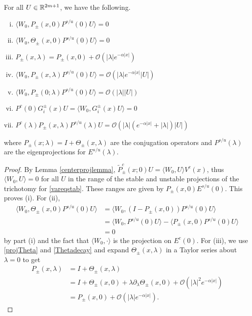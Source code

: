 \documentclass[thesis.tex]{subfiles}
\begin{document}
\begin{lemma}\label{W0projlemma}
For all $U \in \mathbb{R}^{2m+1}$, we have the following.
\begin{enumerate}[(i)]
	\item $\langle W_0, P_\pm(x, 0) P^{s/u}(0) U \rangle = 0$
	\item $\langle W_0, \Theta_\pm(x, 0) P^{s/u}(0) U \rangle = 0$
	\item $P_\pm(x, \lambda) = P_\pm(x, 0) + \mathcal{O}(|\lambda|e^{-\alpha|x|})$
	\item $\langle W_0, P_\pm(x, \lambda) P^{s/u}(0) U \rangle = \mathcal{O}(|\lambda|e^{-\alpha|x|}|U|)$
	\item $\langle W_0, P_\pm(0; \lambda) P^{s/u}(0) U \rangle = \mathcal{O}(|\lambda||U|)$
	\item $P^c(0) G_i^\pm(x) U = \langle W_0, G_i^\pm(x) U\rangle = 0$
	\item $P^c(\lambda) P_\pm(x, \lambda) P^{s/u}(\lambda) U = \mathcal{O}(|\lambda|( e^{-\alpha |x|} + |\lambda|)|U|)$
\end{enumerate}
where $P_\pm(x; \lambda) = I + \Theta_\pm(x, \lambda)$ are the conjugation operators and $P^{s/u}(\lambda)$ are the eigenprojections for $E^{s/u}(\lambda)$.
\begin{proof}
By Lemma \ref{centerprojlemma}, $\tilde{P}_\pm^c(x; 0)U = \langle W_0, U \rangle V^c(x)$, thus $\langle W_0, U \rangle = 0$ for all $U$ in the range of the stable and unstable projections of the trichotomy for \cref{vareqstab}. These ranges are given by $P_\pm(x, 0) E^{s/u}(0)$. This proves (i). For (ii), 
\begin{align*}
\langle W_0, \Theta_\pm(x, 0) P^{s/u}(0) U\rangle &=
\langle W_0, (I - P_\pm(x, 0)) P^{s/u}(0) U\rangle \\
&= \langle W_0, P^{s/u}(0) U \rangle - \langle P_\pm(x, 0)P^{s/u}(0) U \rangle \\
&= 0
\end{align*}
by part (i) and the fact that $\langle W_0, \cdot \rangle$ is the projection on $E^c(0)$. For (iii), we use \cref{projTheta} and \cref{Thetadecay} and expand $\Theta_\pm(x, \lambda)$ in a Taylor series about $\lambda = 0$ to get
\begin{align*}
P_\pm(x, \lambda) &= I + \Theta_\pm(x, \lambda) \\
&= I + \Theta_\pm(x, 0) + \lambda \partial_\lambda \Theta_\pm(x, 0) + \mathcal{O}(|\lambda|^2 e^{-\alpha |x|} ) \\
&= P_\pm(x, 0) + \mathcal{O}(|\lambda|e^{-\alpha|x|}).
\end{align*}

\end{proof}
\end{lemma}
\end{document}
